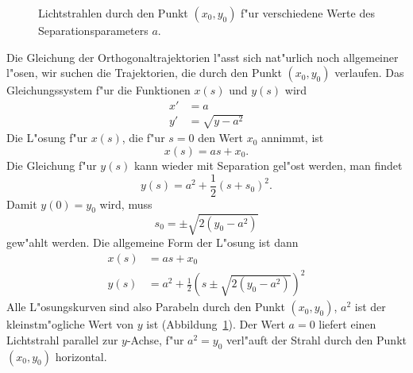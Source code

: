 \begin{diskussion}
\begin{figure}
\centering
{}
\caption{Lichtstrahlen durch den Punkt $(x_0,y_0)$ f"ur verschiedene
Werte des Separationsparameters $a$.
\label{40000008:fata}}
\end{figure}
Die Gleichung der Orthogonaltrajektorien l"asst sich nat"urlich noch
allgemeiner l"osen, wir suchen die Trajektorien, die durch den Punkt
$(x_0,y_0)$ verlaufen.
Das Gleichungssystem f"ur die Funktionen $x(s)$ und $y(s)$ wird
\begin{align*}
x'&=a\\
y'&=\sqrt{y-a^2}
\end{align*}
Die L"osung f"ur $x(s)$, die f"ur $s=0$ den Wert $x_0$ annimmt, ist
\[
x(s)=as+x_0.
\]
Die Gleichung f"ur $y(s)$ kann wieder mit Separation gel"ost werden,
man findet
\[
y(s)=a^2+\frac12(s+s_0)^2.
\]
Damit $y(0)=y_0$ wird, muss 
\[
s_0=\pm \sqrt{2(y_0-a^2)}
\]
gew"ahlt werden.
Die allgemeine Form der L"osung ist dann
\begin{align*}
x(s)&=as+x_0
\\
y(s)&=a^2 + \frac12\left(s\pm\sqrt{2(y_0-a^2)}\right)^2
\end{align*}
Alle L"osungskurven sind also Parabeln durch den Punkt $(x_0,y_0)$,
$a^2$ ist der kleinstm"ogliche Wert von $y$ ist (Abbildung~\ref{40000008:fata}).
Der Wert $a=0$ liefert einen Lichtstrahl parallel zur $y$-Achse, f"ur $a^2=y_0$
verl"auft der Strahl durch den Punkt $(x_0,y_0)$ horizontal.
\end{diskussion}

